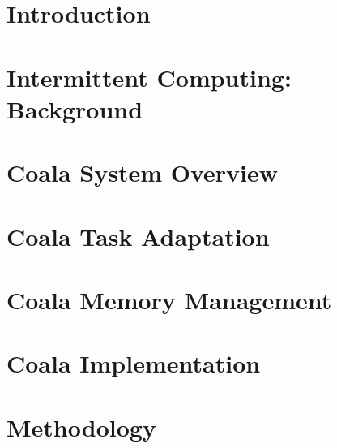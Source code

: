 \documentclass[pageno]{jpaper}
\newcommand{\sys}{Coala\xspace}
\begin{document}
\begin{abstract}	

\end{abstract}

\section{Introduction}
\label{sec:intro}



\section{Intermittent Computing: Background}
\label{sec:background}



\section{\sys System Overview}
\label{sec:systemdescription}



\section{\sys Task Adaptation}
\label{sec:task_adaptation}




\section{\sys Memory Management}
\label{sec:memory_virtulaization}



\section{\sys Implementation}
\label{sec:implementation}




%

\section{Methodology}
\label{sec:methodology}
\end{document}
